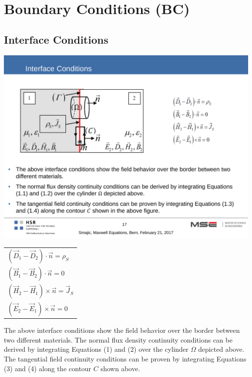 \section{Boundary Conditions (BC)}
\subsection{Interface Conditions}

\begin{minipage}[lt]{8cm}
	\includegraphics[width=.8\textwidth]{./images/InterfaceConditions.pdf}
\end{minipage}
\begin{minipage}[rt]{11cm}
	\begin{tabular}{l}
		$\left(\vec{D}_1 - \vec{D}_2\right) \cdot \vec{n} = \rho_S$ \\
		$\left(\vec{B}_1 - \vec{B}_2\right) \cdot \vec{n} = 0$\\
		$\left(\vec{H}_2 - \vec{H}_1\right) \times \vec{n} =\vec{J}_S$ \\
		$\left(\vec{E}_2 - \vec{E}_1\right) \times \vec{n} = 0$\\
	\end{tabular}
\end{minipage}
The above interface conditions show the field behavior over the border between two different materials. \newline
The normal flux density continuity conditions can be derived by integrating Equations (1) and (2) over the cylinder $\Omega$ depicted above. \newline
The tangential field continuity conditions can be proven by integrating Equations (3) and (4) along the contour $C$ shown above.